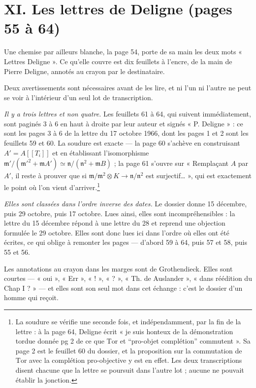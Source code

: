 \documentclass[11pt,a4paper]{article}
\begin{document}
\section*{XI. Les lettres de Deligne (pages 55 à 64)}

Une chemise par ailleurs blanche, la page 54, porte de sa main les deux mots
« Lettres Deligne ». Ce qu'elle couvre est dix feuillets à l'encre, de la main
de Pierre Deligne, annotés au crayon par le destinataire.

Deux avertissements sont nécessaires avant de les lire, et ni l'un ni l'autre ne
peut se voir à l'intérieur d'un seul lot de transcription.

\emph{Il y a trois lettres et non quatre.} Les feuillets 61 à 64, qui suivent
immédiatement, sont paginés 3 à 6 en haut à droite par leur auteur et signés
« P. Deligne » : ce sont les pages 3 à 6 de la lettre du 17 octobre 1966, dont
les pages 1 et 2 sont les feuillets 59 et 60. La soudure est exacte — la page 60
s'achève en construisant $A' = A[[T_{i}]]$ et en établissant l'isomorphisme
$\mathfrak{m}'/(\mathfrak{m}'^{2} + \mathfrak{m}A') \simeq
\mathfrak{n}/(\mathfrak{n}^{2} + \mathfrak{m}B)$ ; la page 61 s'ouvre sur
« Remplaçant $A$ par $A'$, il reste à prouver que si
$\mathfrak{m}/\mathfrak{m}^{2} \otimes K \to \mathfrak{n}/\mathfrak{n}^{2}$
est surjectif… », qui est exactement le point où l'on vient d'arriver.\footnote{La
soudure se vérifie une seconde fois, et indépendamment, par la fin de la
lettre : à la page 64, Deligne écrit « je suis honteux de la démonstration
tordue donnée pg 2 de ce que $\mathrm{Tor}$ et “pro-objet complétion”
commutent ». Sa page 2 est le feuillet 60 du dossier, et la proposition sur la
commutation de $\mathrm{Tor}$ avec la complétion pro-objective y est en effet.
Les deux transcriptions disent chacune que la lettre se poursuit dans l'autre
lot ; aucune ne pouvait établir la jonction.}

\emph{Elles sont classées dans l'ordre inverse des dates.} Le dossier donne 15
décembre, puis 29 octobre, puis 17 octobre. Lues ainsi, elles sont
incompréhensibles : la lettre du 15 décembre répond à une lettre du 28 et
reprend une objection formulée le 29 octobre. Elles sont donc lues ici dans
l'ordre où elles ont été écrites, ce qui oblige à remonter les pages — d'abord
59 à 64, puis 57 et 58, puis 55 et 56.

Les annotations au crayon dans les marges sont de Grothendieck. Elles sont
courtes — « oui », « Err », « ! », « ? », « Th. de Auslander », « dans réédition
du Chap I ? » — et elles sont son seul mot dans cet échange : c'est le dossier
d'un homme qui reçoit.
\end{document}
